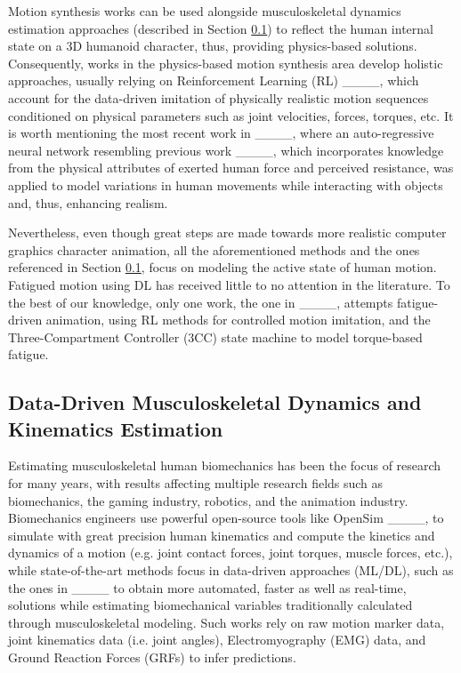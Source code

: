 Motion synthesis works can be used alongside musculoskeletal dynamics estimation approaches (described in Section \ref{sec:Musculoskeletal}) to reflect the human internal state on a 3D humanoid character, thus, providing physics-based solutions. Consequently, works in the physics-based motion synthesis area develop holistic approaches, usually relying on Reinforcement Learning (RL) ____, which account for the data-driven imitation of physically realistic motion sequences conditioned on physical parameters such as joint velocities, forces, torques, etc. It is worth mentioning the most recent work in ____, where an auto-regressive neural network resembling previous work ____, which incorporates knowledge from the physical attributes of exerted human force and perceived resistance, was applied to model variations in human movements while interacting with objects and, thus, enhancing realism.

Nevertheless, even though great steps are made towards more realistic computer graphics character animation, all the aforementioned methods and the ones referenced in Section \ref{sec:Musculoskeletal}, focus on modeling the active state of human motion. Fatigued motion using DL has received little to no attention in the literature. To the best of our knowledge, only one work, the one in ____, attempts fatigue-driven animation, using RL methods for controlled motion imitation, and the Three-Compartment Controller (3CC) state machine to model torque-based fatigue. 

\subsection{Data-Driven Musculoskeletal Dynamics and Kinematics Estimation}
\label{sec:Musculoskeletal}

Estimating musculoskeletal human biomechanics has been the focus of research for many years, with results affecting multiple research fields such as biomechanics, the gaming industry, robotics, and the animation industry. Biomechanics engineers use powerful open-source tools like OpenSim ____, to simulate with great precision human kinematics and compute the kinetics and dynamics of a motion (e.g. joint contact forces, joint torques, muscle forces, etc.), while state-of-the-art methods focus in data-driven approaches (ML/DL), such as the ones in ____ to obtain more automated, faster as well as real-time, solutions while estimating biomechanical variables traditionally calculated through musculoskeletal modeling. Such works rely on raw motion marker data, joint kinematics data (i.e. joint angles), Electromyography (EMG) data, and Ground Reaction Forces (GRFs) to infer predictions. 

